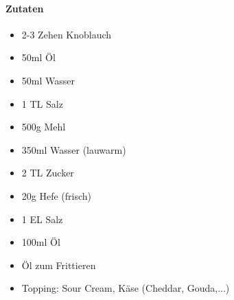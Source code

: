 \newpage
{}

\paragraph{Zutaten}
\begin{itemize}[noitemsep]	
	\item 2-3 Zehen Knoblauch
	\item 50ml  Öl
	\item 50ml Wasser
	\item 1 TL Salz
	\vspace{0.5cm}
	\item 500g Mehl
	\item 350ml Wasser (lauwarm)
	\item 2 TL Zucker
	\item 20g Hefe (frisch)
	\item 1 EL Salz
	\item 100ml Öl
	\item Öl zum Frittieren
	\item Topping: Sour Cream, Käse (Cheddar, Gouda,...)
\end{itemize}

